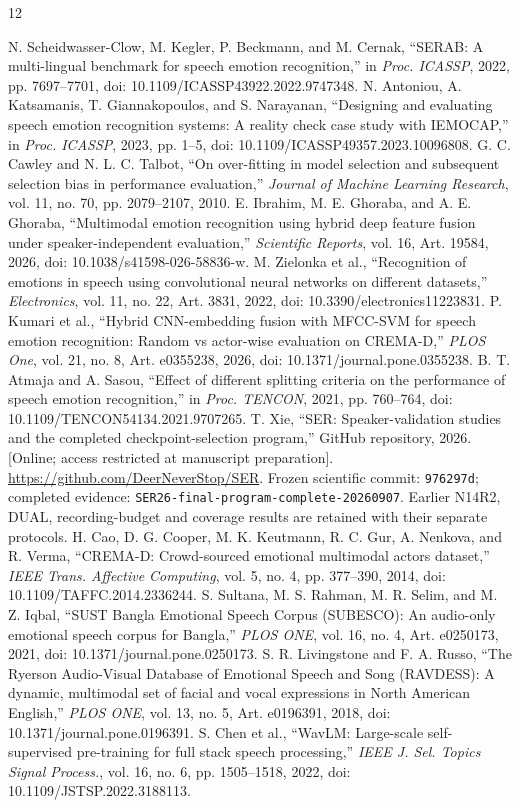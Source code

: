 \documentclass[letterpaper]{article}
\begin{document}
\clearpage
\begin{thebibliography}{12}
\raggedright
{} N. Scheidwasser-Clow, M. Kegler, P. Beckmann, and M. Cernak, ``SERAB: A multi-lingual benchmark for speech emotion recognition,'' in \emph{Proc. ICASSP}, 2022, pp. 7697--7701, doi: 10.1109/ICASSP43922.2022.9747348.
 N. Antoniou, A. Katsamanis, T. Giannakopoulos, and S. Narayanan, ``Designing and evaluating speech emotion recognition systems: A reality check case study with IEMOCAP,'' in \emph{Proc. ICASSP}, 2023, pp. 1--5, doi: 10.1109/ICASSP49357.2023.10096808.
 G. C. Cawley and N. L. C. Talbot, ``On over-fitting in model selection and subsequent selection bias in performance evaluation,'' \emph{Journal of Machine Learning Research}, vol. 11, no. 70, pp. 2079--2107, 2010.
 E. Ibrahim, M. E. Ghoraba, and A. E. Ghoraba, ``Multimodal emotion recognition using hybrid deep feature fusion under speaker-independent evaluation,'' \emph{Scientific Reports}, vol. 16, Art. 19584, 2026, doi: 10.1038/s41598-026-58836-w.
 M. Zielonka et al., ``Recognition of emotions in speech using convolutional neural networks on different datasets,'' \emph{Electronics}, vol. 11, no. 22, Art. 3831, 2022, doi: 10.3390/electronics11223831.
 P. Kumari et al., ``Hybrid CNN-embedding fusion with MFCC-SVM for speech emotion recognition: Random vs actor-wise evaluation on CREMA-D,'' \emph{PLOS One}, vol. 21, no. 8, Art. e0355238, 2026, doi: 10.1371/journal.pone.0355238.
 B. T. Atmaja and A. Sasou, ``Effect of different splitting criteria on the performance of speech emotion recognition,'' in \emph{Proc. TENCON}, 2021, pp. 760--764, doi: 10.1109/TENCON54134.2021.9707265.
 T. Xie, ``SER: Speaker-validation studies and the completed checkpoint-selection program,'' GitHub repository, 2026. [Online; access restricted at manuscript preparation]. \url{https://github.com/DeerNeverStop/SER}. Frozen scientific commit: \texttt{976297d}; completed evidence: \texttt{SER26-final-program-}\allowbreak\texttt{complete-20260907}. Earlier N14R2, DUAL, recording-budget and coverage results are retained with their separate protocols.
 H. Cao, D. G. Cooper, M. K. Keutmann, R. C. Gur, A. Nenkova, and R. Verma, ``CREMA-D: Crowd-sourced emotional multimodal actors dataset,'' \emph{IEEE Trans. Affective Computing}, vol. 5, no. 4, pp. 377--390, 2014, doi: 10.1109/TAFFC.2014.2336244.
 S. Sultana, M. S. Rahman, M. R. Selim, and M. Z. Iqbal, ``SUST Bangla Emotional Speech Corpus (SUBESCO): An audio-only emotional speech corpus for Bangla,'' \emph{PLOS ONE}, vol. 16, no. 4, Art. e0250173, 2021, doi: 10.1371/journal.pone.0250173.
 S. R. Livingstone and F. A. Russo, ``The Ryerson Audio-Visual Database of Emotional Speech and Song (RAVDESS): A dynamic, multimodal set of facial and vocal expressions in North American English,'' \emph{PLOS ONE}, vol. 13, no. 5, Art. e0196391, 2018, doi: 10.1371/journal.pone.0196391.
 S. Chen et al., ``WavLM: Large-scale self-supervised pre-training for full stack speech processing,'' \emph{IEEE J. Sel. Topics Signal Process.}, vol. 16, no. 6, pp. 1505--1518, 2022, doi: 10.1109/JSTSP.2022.3188113.
\end{thebibliography}
\end{document}
